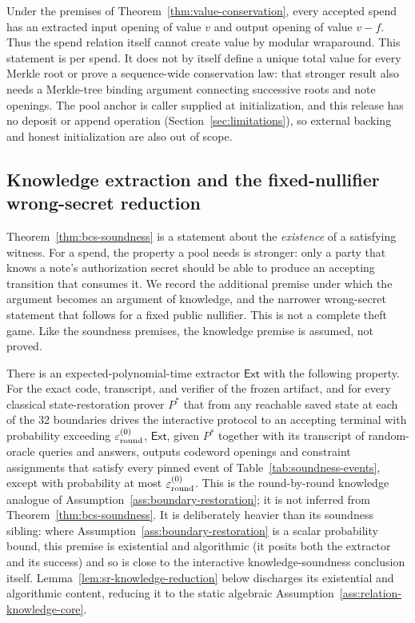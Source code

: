 \begin{corollary}
\label{cor:no-inflation}
Under the premises of Theorem~\ref{thm:value-conservation}, every accepted
spend has an extracted input opening of value \(v\) and output opening of value
\(v-f\).  Thus the spend relation itself cannot create value by modular
wraparound.  This statement is per spend.  It does not by itself define a
unique total value for every Merkle root or prove a sequence-wide conservation
law: that stronger result also needs a Merkle-tree binding argument connecting
successive roots and note openings.  The pool anchor is caller supplied at
initialization, and this release has no deposit or append operation
(Section~\ref{sec:limitations}), so external backing and honest initialization
are also out of scope.
\end{corollary}

\subsection{Knowledge extraction and the fixed-nullifier wrong-secret reduction}
\label{sec:knowledge-soundness}

Theorem~\ref{thm:bcs-soundness} is a statement about the \emph{existence} of a
satisfying witness.  For a spend, the property a pool needs is stronger: only a
party that knows a note's authorization secret should be able to produce an
accepting transition that consumes it.  We record the additional premise under
which the argument becomes an argument of knowledge, and the narrower
wrong-secret statement that follows for a fixed public nullifier.  This is not
a complete theft game.  Like the soundness premises, the knowledge premise is
assumed, not proved.

\begin{assumption}
\label{ass:sr-knowledge}
There is an expected-polynomial-time extractor \(\mathsf{Ext}\) with the
following property.  For the exact code, transcript, and verifier of the frozen
artifact, and for every classical state-restoration prover \(P^\ast\) that from
any reachable saved state at each of the 32 boundaries drives the interactive
protocol to an accepting terminal with probability exceeding
\(\varepsilon_{\rm round}^{(0)}\), \(\mathsf{Ext}\), given \(P^\ast\) together
with its transcript of random-oracle queries and answers, outputs codeword
openings and constraint assignments that satisfy every pinned event of
Table~\ref{tab:soundness-events}, except with probability at most
\(\varepsilon_{\rm round}^{(0)}\).  This is the round-by-round knowledge
analogue of Assumption~\ref{ass:boundary-restoration}; it is not inferred from
Theorem~\ref{thm:bcs-soundness}.  It is deliberately heavier than its
soundness sibling: where Assumption~\ref{ass:boundary-restoration} is a scalar
probability bound, this premise is existential and algorithmic (it posits
both the extractor and its success) and so is close to the interactive
knowledge-soundness conclusion itself.  Lemma~\ref{lem:sr-knowledge-reduction}
below discharges its existential and algorithmic content, reducing it to the
static algebraic Assumption~\ref{ass:relation-knowledge-core}.
\end{assumption}

